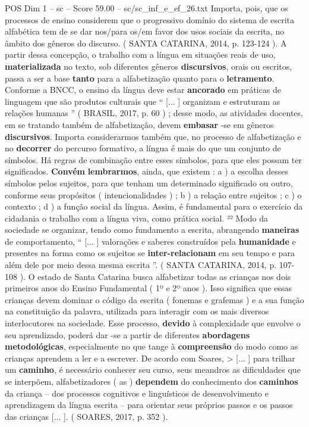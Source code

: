 \begin{textsample}{POS Dim 1 – sc – Score 59.00 – sc/sc\_inf\_e\_ef\_26.txt}
Importa, pois, que os processos de ensino considerem que o progressivo domínio do sistema de escrita alfabética tem de se dar nos/para os/em favor dos usos sociais da escrita, no âmbito dos gêneros do discurso. ( SANTA CATARINA, 2014, p. 123-124 ).
A partir dessa concepção, o trabalho com a língua em situações reais de uso, \textbf{materializada} no texto, sob diferentes gêneros \textbf{discursivos}, orais ou escritos, passa a ser a base \textbf{tanto} para a alfabetização quanto para o \textbf{letramento}.
Conforme a BNCC, o ensino da língua deve estar \textbf{ancorado} em práticas de linguagem que são produtos culturais que “ [... ] organizam e estruturam as relações humanas ” ( BRASIL, 2017, p. 60 ) ; desse modo, as atividades docentes, em se tratando também de alfabetização, devem \textbf{embasar} -se em gêneros \textbf{discursivos}.
Importa considerarmos também que, no processo de alfabetização e no \textbf{decorrer} do percurso formativo, a língua é mais do que um conjunto de símbolos.
Há regras de combinação entre esses símbolos, para que eles possam ter significados. \textbf{Convém} \textbf{lembrarmos}, ainda, que existem : a ) a escolha desses símbolos pelos sujeitos, para que tenham um determinado significado ou outro, conforme seus propósitos ( intencionalidades ) ; b ) a relação entre sujeitos ; c ) o contexto ; d ) a função social da língua.
Assim, é fundamental para o exercício da cidadania o trabalho com a língua viva, como prática social. ²² Modo da sociedade se organizar, tendo como fundamento a escrita, abrangendo \textbf{maneiras} de comportamento, “ [... ] valorações e saberes construídos pela \textbf{humanidade} e presentes na forma como os sujeitos se \textbf{inter-relacionam} em seu tempo e para além dele por meio dessa mesma escrita ”. ( SANTA CATARINA, 2014, p. 107-108 ).
O estado de Santa Catarina busca alfabetizar todas as crianças nos dois primeiros anos do Ensino Fundamental ( 1º e 2º anos ).
Isso significa que essas crianças devem dominar o código da escrita ( fonemas e grafemas ) e a sua função na constituição da palavra, utilizada para interagir com os mais diversos interlocutores na sociedade.
Esse processo, \textbf{devido} à complexidade que envolve o seu aprendizado, poderá dar -se a partir de diferentes \textbf{abordagens} \textbf{metodológicas}, especialmente no que tange à \textbf{compreensão} do modo como as crianças aprendem a ler e a escrever.
De acordo com Soares, > [... ] para trilhar um \textbf{caminho}, é necessário conhecer seu curso, seus meandros as dificuldades que se interpõem, alfabetizadores ( as ) \textbf{dependem} do conhecimento dos \textbf{caminhos} da criança – dos processos cognitivos e linguísticos de desenvolvimento e aprendizagem da língua escrita – para orientar seus próprios passos e os passos das crianças [... ]. ( SOARES, 2017, p. 352 ).

\end{textsample}
